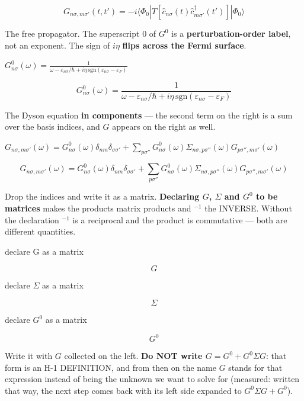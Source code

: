\documentclass[dvipdfmx]{article}
\begin{document}
\begin{equation}
  G_{n\sigma,m\sigma'}(t,t') = -i\langle\Phi_0| T[\hat c_{n\sigma}(t) \hat c^\dagger_{m\sigma'}(t')]|\Phi_0\rangle
  \label{eq:E17}
\end{equation}

The free propagator. The superscript 0 of $G^0$ is a \textbf{perturbation-order label}, not an exponent. The sign of $i\eta$ \textbf{flips across the Fermi surface}.

$G^0_{n\sigma}(\omega) = \frac{1}{\omega - \varepsilon_{n\sigma}/\hbar + i\eta\,\mathrm{sgn}(\varepsilon_{n\sigma}-\varepsilon_F)}$

\begin{equation}
  G^0_{n\sigma}(\omega) = \frac{1}{\omega - \varepsilon_{n\sigma}/\hbar + i\eta\,\mathrm{sgn}(\varepsilon_{n\sigma}-\varepsilon_F)}
  \label{eq:E18}
\end{equation}

The Dyson equation \textbf{in components} — the second term on the right is a sum over the basis indices, and $G$ appears on the right as well.

$G_{n\sigma,m\sigma'}(\omega) = G^0_{n\sigma}(\omega)\delta_{nm}\delta_{\sigma\sigma'} + \sum_{p \sigma''} G^0_{n\sigma}(\omega) \Sigma_{n\sigma,p\sigma''}(\omega) G_{p\sigma'',m\sigma'}(\omega)$

\begin{equation}
  G_{n\sigma,m\sigma'}(\omega) = G^0_{n\sigma}(\omega)\delta_{nm}\delta_{\sigma\sigma'} + \sum_{p \sigma''} G^0_{n\sigma}(\omega) \Sigma_{n\sigma,p\sigma''}(\omega) G_{p\sigma'',m\sigma'}(\omega)
  \label{eq:E19}
\end{equation}

Drop the indices and write it as a matrix. \textbf{Declaring $G$, $\Sigma$ and $G^0$ to be matrices} makes the products matrix products and $^{-1}$ the INVERSE. Without the declaration $^{-1}$ is a reciprocal and the product is commutative — both are different quantities.

declare G as a matrix

\[
  G
\]

declare $\Sigma$ as a matrix

\[
  \Sigma
\]

declare $G^0$ as a matrix

\[
  G^{0}
\]

Write it with $G$ collected on the left. \textbf{Do NOT write $G = G^0 + G^0\Sigma G$}: that form is an H-1 DEFINITION, and from then on the name $G$ stands for that expression instead of being the unknown we want to solve for (measured: written that way, the next step comes back with its left side expanded to $G^0\Sigma G+G^0$).
\end{document}
